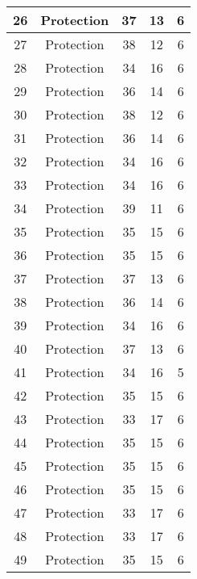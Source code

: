 \documentclass[results.tex]{subfiles}
\begin{document}
\begin{center}
\begin{tabular}{| c || c | c | c | c |}
    \hline
    26 & Protection & 37 & 13 & 6 \\ 
    \hline
    27 & Protection & 38 & 12 & 6 \\ 
    \hline
    28 & Protection & 34 & 16 & 6 \\ 
    \hline
    29 & Protection & 36 & 14 & 6 \\ 
    \hline
    30 & Protection & 38 & 12 & 6 \\ 
    \hline
    31 & Protection & 36 & 14 & 6 \\ 
    \hline
    32 & Protection & 34 & 16 & 6 \\ 
    \hline
    33 & Protection & 34 & 16 & 6 \\ 
    \hline
    34 & Protection & 39 & 11 & 6 \\ 
    \hline
    35 & Protection & 35 & 15 & 6 \\ 
    \hline
    36 & Protection & 35 & 15 & 6 \\ 
    \hline
    37 & Protection & 37 & 13 & 6 \\ 
    \hline
    38 & Protection & 36 & 14 & 6 \\ 
    \hline
    39 & Protection & 34 & 16 & 6 \\ 
    \hline
    40 & Protection & 37 & 13 & 6 \\ 
    \hline
    41 & Protection & 34 & 16 & 5 \\ 
    \hline
    42 & Protection & 35 & 15 & 6 \\ 
    \hline
    43 & Protection & 33 & 17 & 6 \\ 
    \hline
    44 & Protection & 35 & 15 & 6 \\ 
    \hline
    45 & Protection & 35 & 15 & 6 \\ 
    \hline
    46 & Protection & 35 & 15 & 6 \\ 
    \hline
    47 & Protection & 33 & 17 & 6 \\ 
    \hline
    48 & Protection & 33 & 17 & 6 \\ 
    \hline
    49 & Protection & 35 & 15 & 6 \\ 
    \hline   \end{tabular}
\end{center}
\end{document}
